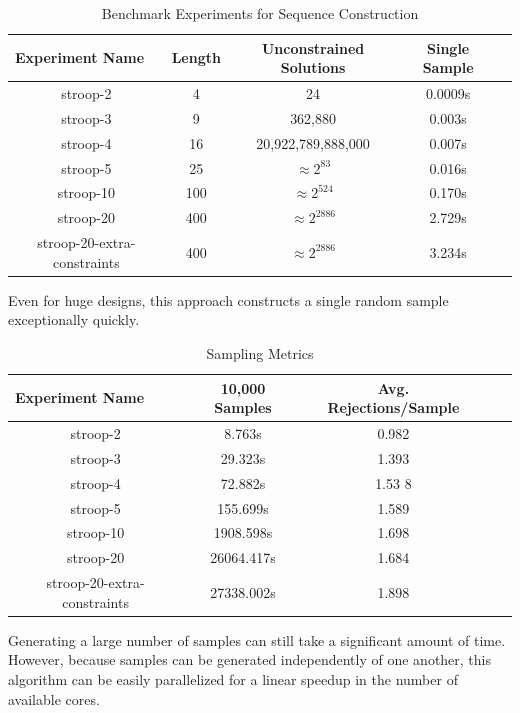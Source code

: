\begin{table}[b]
  \centering
  \caption{Benchmark Experiments for Sequence Construction}
\begin{tabular}{|c|c|c|c|c|}
\hline
\multicolumn{1}{|l|}{Experiment Name} & Length          & Unconstrained Solutions  & Single Sample  \\ \hline
stroop-2                              & 4               & 24                       & 0.0009s        \\ \hline
stroop-3                              & 9               & 362,880                  & 0.003s         \\ \hline
stroop-4                              & 16              & 20,922,789,888,000       & 0.007s         \\ \hline
stroop-5                              & 25              & $\approx 2^{83}$         & 0.016s         \\ \hline
stroop-10                             & 100             & $\approx 2^{524}$        & 0.170s         \\ \hline
stroop-20                             & 400             & $\approx 2^{2886}$       & 2.729s         \\ \hline
stroop-20-extra-constraints           & 400             & $\approx 2^{2886}$       & 3.234s         \\ \hline
\end{tabular}
\label{tab:benchmark_experiments_construction}
\end{table}

Even for huge designs, this approach constructs a single random sample exceptionally quickly.

\begin{table}[t]
  \centering
  \caption{Sampling Metrics}
\begin{tabular}{|c|c|c|c|c|}
\hline
\multicolumn{1}{|l|}{Experiment Name} & 10,000 Samples & Avg. Rejections/Sample  \\ \hline
stroop-2                              & 8.763s         & 0.982                   \\ \hline
stroop-3                              & 29.323s        & 1.393                   \\ \hline
stroop-4                              & 72.882s        & 1.53
8                   \\ \hline
stroop-5                              & 155.699s       & 1.589                   \\ \hline
stroop-10                             & 1908.598s      & 1.698                   \\ \hline
stroop-20                             & 26064.417s     & 1.684                   \\ \hline
stroop-20-extra-constraints           & 27338.002s     & 1.898                   \\ \hline
\end{tabular}
\label{tab:sampling_metrics}
\end{table}

Generating a large number of samples can still take a significant amount of time. However, because samples can be generated independently of one another, this algorithm can be easily parallelized for a linear speedup in the number of available cores.
